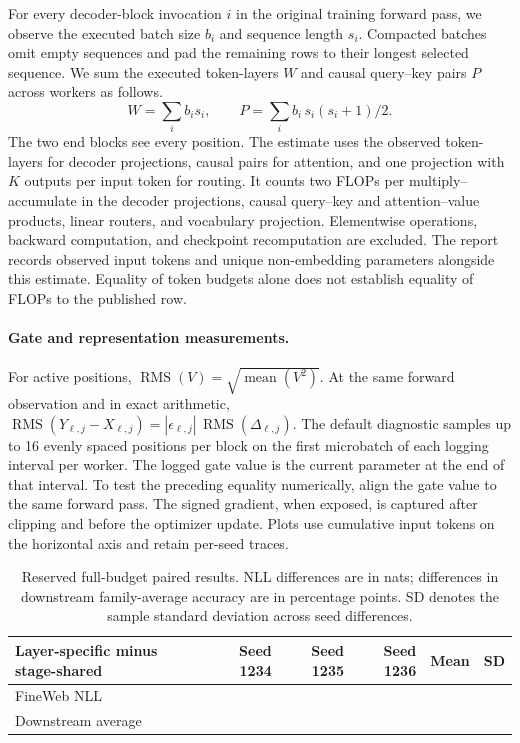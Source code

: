\documentclass[11pt,letterpaper]{article}
\newcommand{\pending}{\textcolor{muted}{\textemdash}}
\newcommand{\rms}{\operatorname{RMS}}
\begin{document}
For every decoder-block invocation \(i\) in the original training forward pass, we observe the executed batch size \(b_i\) and sequence length \(s_i\). Compacted batches omit empty sequences and pad the remaining rows to their longest selected sequence. We sum the executed token-layers \(W\) and causal query--key pairs \(P\) across workers as follows.
\begin{equation}
 W=\sum_i b_i s_i,\qquad P=\sum_i b_i\,s_i(s_i+1)/2.
\end{equation}
The two end blocks see every position. The estimate uses the observed token-layers for decoder projections, causal pairs for attention, and one projection with \(K\) outputs per input token for routing. It counts two FLOPs per multiply--accumulate in the decoder projections, causal query--key and attention--value products, linear routers, and vocabulary projection. Elementwise operations, backward computation, and checkpoint recomputation are excluded. The report records observed input tokens and unique non-embedding parameters alongside this estimate. Equality of token budgets alone does not establish equality of FLOPs to the published row.

\paragraph{Gate and representation measurements.}
For active positions, \(\rms(V)=\sqrt{\operatorname{mean}(V^2)}\).
At the same forward observation and in exact arithmetic,
\(\rms(Y_{\ell,j}-X_{\ell,j})=|\epsilon_{\ell,j}|\,\rms(\Delta_{\ell,j})\).
The default diagnostic samples up to 16 evenly spaced positions per block on the first microbatch of each logging interval per worker. The logged gate value is the current parameter at the end of that interval. To test the preceding equality numerically, align the gate value to the same forward pass. The signed gradient, when exposed, is captured after clipping and before the optimizer update. Plots use cumulative input tokens on the horizontal axis and retain per-seed traces.

\begin{table}[htbp]
\centering
\caption{Reserved full-budget paired results. NLL differences are in nats; differences in downstream family-average accuracy are in percentage points. SD denotes the sample standard deviation across seed differences.}
\label{tab:pairs}
\small
\begin{tabular}{@{}lrrrrr@{}}
\toprule
Layer-specific minus stage-shared & Seed 1234 & Seed 1235 & Seed 1236 & Mean & SD\\
\midrule
FineWeb NLL & \pending & \pending & \pending & \pending & \pending\\
Downstream average & \pending & \pending & \pending & \pending & \pending\\
\bottomrule
\end{tabular}
\end{table}
\end{document}
